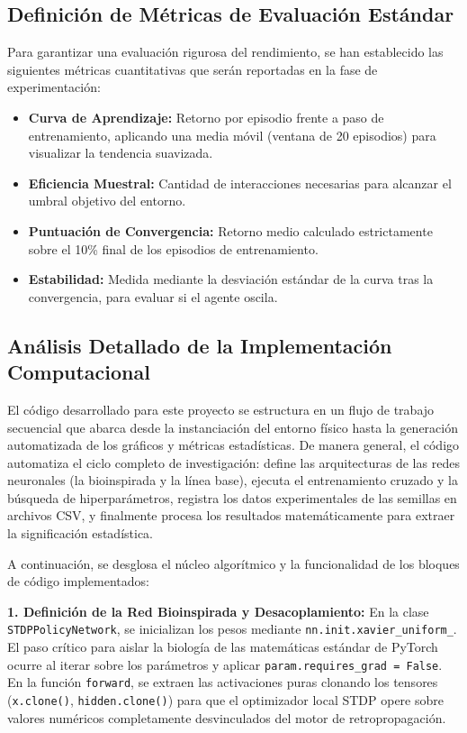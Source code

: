 \documentclass[conference, 10pt]{IEEEtran}
\begin{document}
\subsection{Definición de Métricas de Evaluación Estándar}
Para garantizar una evaluación rigurosa del rendimiento, se han establecido las siguientes métricas cuantitativas que serán reportadas en la fase de experimentación:
\begin{itemize}
    \item \textbf{Curva de Aprendizaje:} Retorno por episodio frente a paso de entrenamiento, aplicando una media móvil (ventana de 20 episodios) para visualizar la tendencia suavizada.
    \item \textbf{Eficiencia Muestral:} Cantidad de interacciones necesarias para alcanzar el umbral objetivo del entorno.
    \item \textbf{Puntuación de Convergencia:} Retorno medio calculado estrictamente sobre el 10\% final de los episodios de entrenamiento.
    \item \textbf{Estabilidad:} Medida mediante la desviación estándar de la curva tras la convergencia, para evaluar si el agente oscila.
\end{itemize}

\subsection{Análisis Detallado de la Implementación Computacional}
El código desarrollado para este proyecto se estructura en un flujo de trabajo secuencial que abarca desde la instanciación del entorno físico hasta la generación automatizada de los gráficos y métricas estadísticas. De manera general, el código automatiza el ciclo completo de investigación: define las arquitecturas de las redes neuronales (la bioinspirada y la línea base), ejecuta el entrenamiento cruzado y la búsqueda de hiperparámetros, registra los datos experimentales de las semillas en archivos CSV, y finalmente procesa los resultados matemáticamente para extraer la significación estadística.

A continuación, se desglosa el núcleo algorítmico y la funcionalidad de los bloques de código implementados:

\textbf{1. Definición de la Red Bioinspirada y Desacoplamiento:}
En la clase \texttt{STDPPolicyNetwork}, se inicializan los pesos mediante \texttt{nn.init.xavier\_uniform\_}. El paso crítico para aislar la biología de las matemáticas estándar de PyTorch ocurre al iterar sobre los parámetros y aplicar \texttt{param.requires\_grad = False}. En la función \texttt{forward}, se extraen las activaciones puras clonando los tensores (\texttt{x.clone()}, \texttt{hidden.clone()}) para que el optimizador local STDP opere sobre valores numéricos completamente desvinculados del motor de retropropagación.
\end{document}
